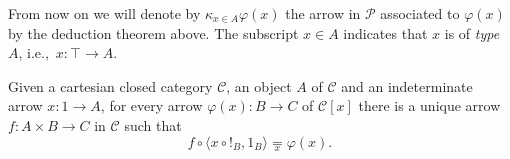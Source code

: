 \begin{notation}
    From now on we will denote by $\kappa_{x \in A}\varphi(x)$ the arrow in $\mathcal P$ associated to $\varphi(x)$ by the deduction theorem above.\label{idx:deduction}
    The subscript $x \in A$ indicates that $x$ is of \emph{type} $A$, i.e.,\ $x : \top \to A$.
\end{notation}

\begin{theorem}\label{thm:functional-completeness}
    Given a cartesian closed category $\mathcal C$, an object $A$ of $\mathcal C$ and an indeterminate arrow $x : 1 \to A$, for every arrow $\varphi(x) : B \to C$ of $\mathcal C[x]$
    there is a unique arrow $f : A \times B \to C$ in $\mathcal C$ such that
    \[ f \circ \langle x \circ !_B, 1_B\rangle \underset{x}{=} \varphi(x). \]
\end{theorem}

